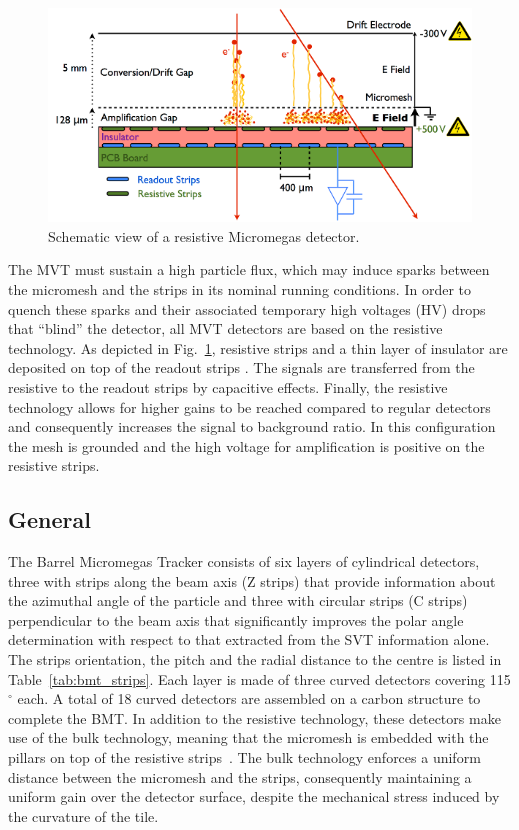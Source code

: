 \begin{figure}[thb]
\begin{center}
\includegraphics[width=1.8\columnwidth,keepaspectratio]{images/mm_principle}
\end{center}

\caption{Schematic view of a resistive Micromegas detector.}
\label{fig:mm-principle}
\end{figure}

The MVT must sustain a high particle flux, which may induce sparks between the micromesh and the strips in its nominal
running conditions. In order to quench these sparks and their associated temporary high voltages (HV) drops that ``blind''
the detector, all MVT detectors are based on the resistive technology. As depicted in Fig.~\ref{fig:mm-principle}, resistive
strips and a thin layer of insulator are deposited on top of the readout strips \cite{ALEXOPOULOS2011110}. The signals are
transferred from the resistive to the readout strips by capacitive effects. Finally, the resistive technology allows for higher
gains to be reached compared to regular detectors and consequently increases the signal to background ratio. In this
configuration the mesh is grounded and the high voltage for amplification is positive on the resistive strips. 

\subsection{General}

The Barrel Micromegas Tracker consists of six layers of cylindrical detectors, three with strips along the beam axis (Z strips)
that provide information about the azimuthal angle of the particle and three with circular strips (C strips) perpendicular to the
beam axis that significantly improves the polar angle determination with respect to that extracted from the SVT information
alone. The strips orientation, the pitch and the radial distance to the centre is listed in 
Table~\ref{tab:bmt_strips}. Each layer is made of three curved detectors covering 115$^\circ$ each. A total of 18 
curved detectors are assembled on a carbon structure to complete the BMT. In addition to the resistive technology, 
these detectors make use of the bulk technology, meaning that the micromesh is embedded with the pillars on top of the 
resistive strips~\cite{GIOMATARIS2006405}. The bulk technology enforces a uniform distance between the micromesh and the 
strips, consequently maintaining a uniform gain over the detector surface, despite the mechanical stress induced by the 
curvature of the tile.

